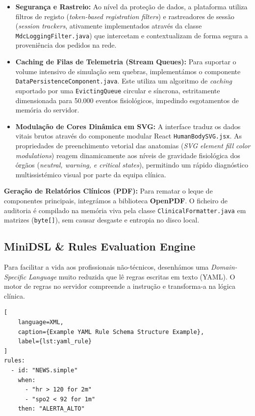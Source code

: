 \documentclass[11pt,a4paper]{article}
\begin{document}
\begin{itemize}[label=\color{accentblue}\bullet]
    \item \textbf{Segurança e Rastreio:} Ao nível da proteção de dados, a plataforma utiliza filtros de registo (\textit{token-based registration filters}) e rastreadores de sessão (\textit{session trackers}, ativamente implementados através da classe \texttt{MdcLoggingFilter.java}) que intercetam e contextualizam de forma segura a proveniência dos pedidos na rede.
    \item \textbf{Caching de Filas de Telemetria (Stream Queues):} Para suportar o volume intensivo de simulação sem quebras, implementámos o componente \texttt{DataPersistenceComponent.java}. Este utiliza um algoritmo de \textit{caching} suportado por uma \texttt{EvictingQueue} circular e síncrona, estritamente dimensionada para 50.000 eventos fisiológicos, impedindo esgotamentos de memória do servidor.
    \item \textbf{Modulação de Cores Dinâmica em SVG:} A interface traduz os dados vitais brutos através do componente modular React \texttt{HumanBodySVG.jsx}. As propriedades de preenchimento vetorial das anatomias (\textit{SVG element fill color modulations}) reagem dinamicamente aos níveis de gravidade fisiológica dos órgãos (\textit{neutral, warning, e critical states}), permitindo um rápido diagnóstico multissistémico visual por parte da equipa clínica.
\end{itemize}

\textbf{Geração de Relatórios Clínicos (PDF):} Para rematar o leque de componentes principais, integrámos a biblioteca \textbf{OpenPDF}. O ficheiro de auditoria é compilado na memória viva pela classe \texttt{ClinicalFormatter.java} em matrizes (\texttt{byte[]}), sem causar desgaste e entropia no disco local.

\subsection{MiniDSL \& Rules Evaluation Engine}
Para facilitar a vida aos profissionais não-técnicos, desenhámos uma \textit{Domain-Specific Language} muito reduzida que lê regras escritas em texto (YAML). O motor de regras no servidor compreende a instrução e transforma-a na lógica clínica.

\begin{lstlisting}[
    language=XML,
    caption={Example YAML Rule Schema Structure Example}, 
    label={lst:yaml_rule}
]
rules:
  - id: "NEWS.simple"
    when:
      - "hr > 120 for 2m"
      - "spo2 < 92 for 1m"
    then: "ALERTA_ALTO"
\end{lstlisting}
\end{document}
